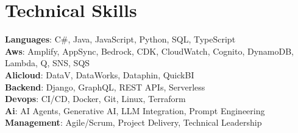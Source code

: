 \section{Technical Skills}
 \begin{itemize}[leftmargin=0.15in, label={}]
    \small{\item{
     \textbf{Languages}{: C\#, Java, JavaScript, Python, SQL, TypeScript} \\
     \textbf{Aws}{: Amplify, AppSync, Bedrock, CDK, CloudWatch, Cognito, DynamoDB, Lambda, Q, SNS, SQS} \\
     \textbf{Alicloud}{: DataV, DataWorks, Dataphin, QuickBI} \\
     \textbf{Backend}{: Django, GraphQL, REST APIs, Serverless} \\
     \textbf{Devops}{: CI/CD, Docker, Git, Linux, Terraform} \\
     \textbf{Ai}{: AI Agents, Generative AI, LLM Integration, Prompt Engineering} \\
     \textbf{Management}{: Agile/Scrum, Project Delivery, Technical Leadership} \\
    }}
 \end{itemize}